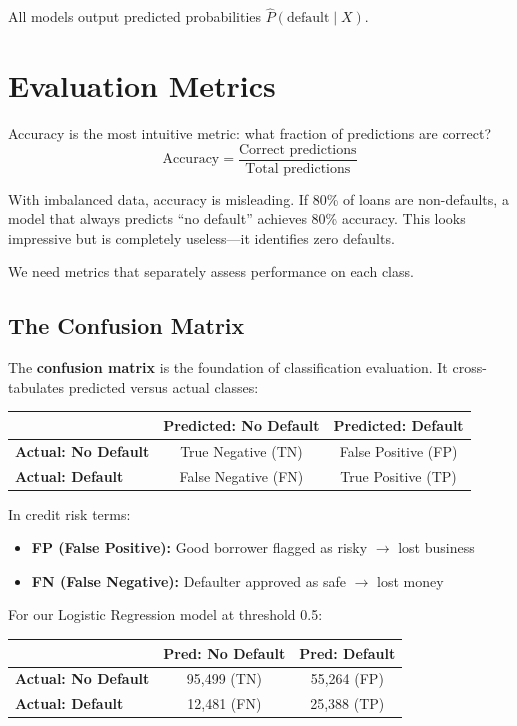 \documentclass[11pt,a4paper]{article}
\newcommand{\keyword}[1]{\textbf{\textcolor{AccentOrange}{#1}}}
\begin{document}
All models output predicted probabilities $\widehat{P}(\text{default} \mid X)$.

\section{Evaluation Metrics}
Accuracy is the most intuitive metric: what fraction of predictions are correct?
\[
\text{Accuracy} = \frac{\text{Correct predictions}}{\text{Total predictions}}
\]

With imbalanced data, accuracy is misleading. If 80\% of loans are non-defaults, a model that always predicts ``no default'' achieves 80\% accuracy. This looks impressive but is completely useless---it identifies zero defaults.

We need metrics that separately assess performance on each class.

\subsection{The Confusion Matrix}

The \keyword{confusion matrix} is the foundation of classification evaluation. It cross-tabulates predicted versus actual classes:

\begin{center}
\begin{tabular}{l|cc}
 & \textbf{Predicted: No Default} & \textbf{Predicted: Default} \\
\hline
\textbf{Actual: No Default} & True Negative (TN) & False Positive (FP) \\
\textbf{Actual: Default} & False Negative (FN) & True Positive (TP) \\
\end{tabular}
\end{center}

In credit risk terms:
\begin{itemize}
    \item \textbf{FP (False Positive):} Good borrower flagged as risky $\rightarrow$ lost business
    \item \textbf{FN (False Negative):} Defaulter approved as safe $\rightarrow$ lost money
\end{itemize}

For our Logistic Regression model at threshold 0.5:
\begin{center}
\begin{tabular}{l|cc}
 & \textbf{Pred: No Default} & \textbf{Pred: Default} \\
\hline
\textbf{Actual: No Default} & 95,499 (TN) & 55,264 (FP) \\
\textbf{Actual: Default} & 12,481 (FN) & 25,388 (TP) \\
\end{tabular}
\end{center}
\end{document}
